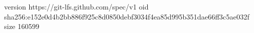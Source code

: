 version https://git-lfs.github.com/spec/v1
oid sha256:e152e0d4b2bb886f925c8d0850debf3034f4ea85d995b351dae66ff3c5ae032f
size 160599
